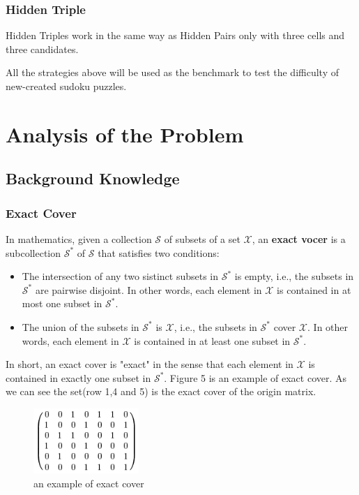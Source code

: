 \documentclass{mcmthesis}
\begin{document}
\subsubsection{Hidden Triple}
Hidden Triples work in the same way as Hidden Pairs only with three cells and three candidates.\newline

All the strategies above will be used as the benchmark to test the difficulty of new-created sudoku puzzles.

\section{Analysis of the Problem}
\subsection{Background Knowledge}

\subsubsection{Exact Cover}
In mathematics, given a collection $\mathcal{S}$ of subsets of a set $\mathcal{X}$, an \textbf{exact vocer} is a subcollection $\mathcal{S^*}$ of $\mathcal{S}$ that satisfies two conditions:
\begin{itemize}
	\item The intersection of any two sistinct subsets in $\mathcal{S^*}$ is empty, i.e., the subsets in $\mathcal{S^*}$ are pairwise disjoint. In other words, each element in $\mathcal{X}$ is contained in at most one subset in $\mathcal{S^*}$.
	\item The union of the subsets in $\mathcal{S^*}$ is $\mathcal{X}$, i.e., the subsets in $\mathcal{S^*}$ cover $\mathcal{X}$. In other words, each element in $\mathcal{X}$ is contained in at least one subset in $\mathcal{S^*}$.
\end{itemize}

\indent In short, an exact cover is "exact" in the sense that each element in $\mathcal{X}$ is contained in exactly one subset in $\mathcal{S^*}$. Figure 5 is an example of exact cover. As we can see the set(row 1,4 and 5) is the exact cover of the origin matrix.

\begin{figure}[htbp]
\small
\centering
\includegraphics[width=4cm]{figures/exact_cover.png}
\caption{an example of exact cover} \label{fig:2.1.1}
\end{figure}
\end{document}
